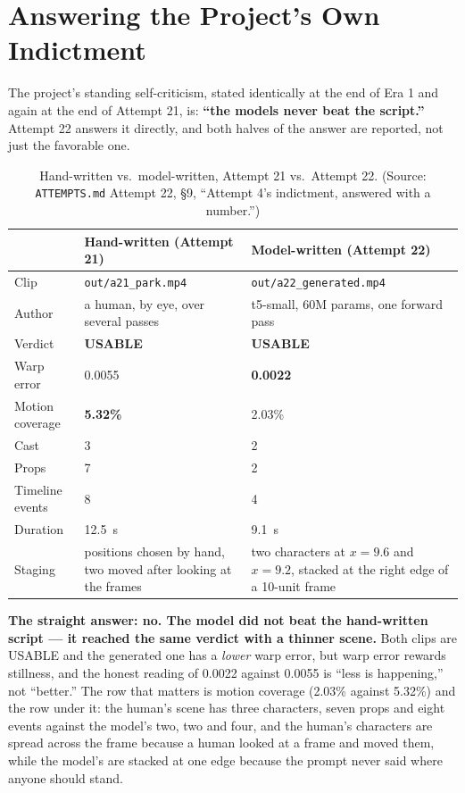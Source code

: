 \documentclass[11pt]{article}
\newcommand{\secsym}{\S}
\begin{document}
\section{Answering the Project's Own Indictment}
\label{sec:indictment}

The project's standing self-criticism, stated identically at the end of
Era 1 and again at the end of Attempt 21, is: \textbf{``the models never
beat the script.''} Attempt 22 answers it directly, and both halves of
the answer are reported, not just the favorable one.

\begin{table}[h]
\centering
\caption{Hand-written vs.\ model-written, Attempt 21 vs.\ Attempt 22.
(Source: \texttt{ATTEMPTS.md} Attempt 22, \secsym9, ``Attempt 4's
indictment, answered with a number.'')}
\label{tab:indictment}
\begin{tabular}{@{}L{3.2cm}L{4.7cm}L{5.2cm}@{}}
\toprule
 & Hand-written (Attempt 21) & Model-written (Attempt 22) \\
\midrule
Clip & \texttt{out/a21\_park.mp4} & \texttt{out/a22\_generated.mp4} \\
Author & a human, by eye, over several passes & t5-small, 60M params, one
  forward pass \\
Verdict & \textbf{USABLE} & \textbf{USABLE} \\
Warp error & 0.0055 & \textbf{0.0022} \\
Motion coverage & \textbf{5.32\%} & 2.03\% \\
Cast & 3 & 2 \\
Props & 7 & 2 \\
Timeline events & 8 & 4 \\
Duration & 12.5~s & 9.1~s \\
Staging & positions chosen by hand, two moved after looking at the
  frames & two characters at $x{=}9.6$ and $x{=}9.2$, stacked at the
  right edge of a 10-unit frame \\
\bottomrule
\end{tabular}
\end{table}

\textbf{The straight answer: no. The model did not beat the hand-written
script --- it reached the same verdict with a thinner scene.} Both clips
are USABLE and the generated one has a \emph{lower} warp error, but warp
error rewards stillness, and the honest reading of 0.0022 against 0.0055
is ``less is happening,'' not ``better.'' The row that matters is motion
coverage (2.03\% against 5.32\%) and the row under it: the human's scene
has three characters, seven props and eight events against the model's
two, two and four, and the human's characters are spread across the
frame because a human looked at a frame and moved them, while the
model's are stacked at one edge because the prompt never said where
anyone should stand.
\end{document}
